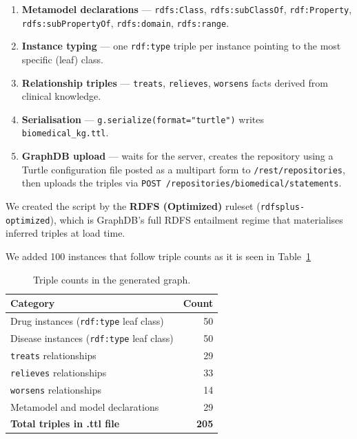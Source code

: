 \documentclass[11pt,a4paper]{article}
\begin{document}
\begin{enumerate}[noitemsep]
  \item \textbf{Metamodel declarations} — \texttt{rdfs:Class},
        \texttt{rdfs:subClassOf}, \texttt{rdf:Property},
        \texttt{rdfs:subPropertyOf}, \texttt{rdfs:domain}, \texttt{rdfs:range}.
  \item \textbf{Instance typing} — one \texttt{rdf:type} triple per instance
        pointing to the most specific (leaf) class.
  \item \textbf{Relationship triples} — \texttt{treats}, \texttt{relieves},
        \texttt{worsens} facts derived from clinical knowledge.
  \item \textbf{Serialisation} — \texttt{g.serialize(format="turtle")} writes
        \texttt{biomedical\_kg.ttl}.
  \item \textbf{GraphDB upload} — waits for the server, creates the repository
        using a Turtle configuration file posted as a multipart form to
        \texttt{/rest/repositories}, then uploads the triples via
        \texttt{POST /repositories/biomedical/statements}.
\end{enumerate}

We created the script by  the \textbf{RDFS (Optimized)} ruleset
(\texttt{rdfsplus-optimized}), which is GraphDB's full RDFS entailment regime
that materialises inferred triples at load time.

We added 100 instances that follow triple counts as it is seen in Table~\ref{tab:counts}
\begin{table}[h!]
\centering
\caption{Triple counts in the generated graph.}
\label{tab:counts}
\begin{tabular}{@{}lr@{}}
\toprule
\textbf{Category} & \textbf{Count} \\
\midrule
Drug instances (\texttt{rdf:type} leaf class)    & 50 \\
Disease instances (\texttt{rdf:type} leaf class) & 50 \\
\texttt{treats} relationships                    & 29 \\
\texttt{relieves} relationships                  & 33 \\
\texttt{worsens} relationships                   & 14 \\
Metamodel and model declarations                 & 29 \\
\midrule
\textbf{Total triples in .ttl file}              & \textbf{205} \\
\bottomrule
\end{tabular}
\end{table}
\end{document}
